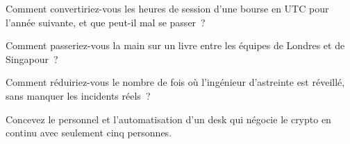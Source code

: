 \begin{interviewq}\label{iq:in:hours-rhythm-and-intensity:3}
Comment convertiriez-vous les heures de session d'une bourse en UTC pour l'année suivante, et que peut-il mal se passer~?
\end{interviewq}

\begin{interviewq}\label{iq:in:hours-rhythm-and-intensity:4}
Comment passeriez-vous la main sur un livre entre les équipes de Londres et de Singapour~?
\end{interviewq}

\begin{interviewq}\label{iq:in:hours-rhythm-and-intensity:5}
Comment réduiriez-vous le nombre de fois où l'ingénieur d'astreinte est réveillé, sans manquer les incidents réels~?
\end{interviewq}

\begin{interviewq}\label{iq:in:hours-rhythm-and-intensity:6}
Concevez le personnel et l'automatisation d'un desk qui négocie le crypto en continu avec seulement cinq personnes.
\end{interviewq}
